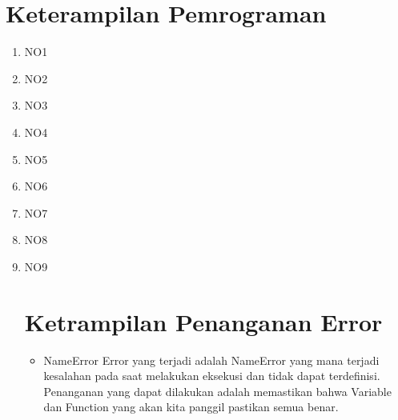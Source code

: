 \section{Keterampilan Pemrograman}
\begin{enumerate}

\item NO1



\item NO2



\item NO3
	


\item NO4



\item NO5



\item NO6



\item NO7



\item NO8



\item NO9



\section{Ketrampilan Penanganan Error}

\begin{itemize}
\item NameError
Error yang terjadi adalah NameError yang mana terjadi kesalahan pada saat melakukan eksekusi dan tidak dapat terdefinisi.
Penanganan yang dapat dilakukan adalah memastikan bahwa Variable dan Function yang akan kita panggil pastikan semua benar.


\end{itemize}
\end{enumerate}
